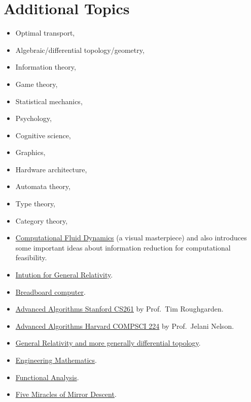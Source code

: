 \hypertarget{additional-topics}{%
\section{Additional Topics}\label{additional-topics}}

\begin{itemize}
\tightlist
\item
  Optimal transport,
\item
  Algebraic/differential topology/geometry,
\item
  Information theory,
\item
  Game theory,
\item
  Statistical mechanics,
\item
  Psychology,
\item
  Cognitive science,
\item
  Graphics,
\item
  Hardware architecture,
\item
  Automata theory,
\item
  Type theory,
\item
  Category theory,
\item
  \href{https://www.youtube.com/c/braintruffle/videos}{Computational
  Fluid Dynamics} (a visual masterpiece) and also introduces some
  important ideas about information reduction for computational
  feasibility.
\item
  \href{https://www.youtube.com/playlist?list=PLu7cY2CPiRjVY-VaUZ69bXHZr5QslKbzo}{Intution
  for General Relativity}.
\item
  \href{https://www.youtube.com/playlist?list=PLowKtXNTBypGqImE405J2565dvjafglHU}{Breadboard
  computer}.
\item
  \href{https://www.youtube.com/playlist?list=PLEGCF-WLh2RJh2yDxlJJjnKswWdoO8gAc}{Advanced
  Algorithms Stanford CS261} by Prof.~Tim Roughgarden.
\item
  \href{https://www.youtube.com/playlist?list=PL2SOU6wwxB0uP4rJgf5ayhHWgw7akUWSf}{Advanced
  Algorithms Harvard COMPSCI 224} by Prof.~Jelani Nelson.
\item
  \href{https://www.youtube.com/playlist?list=PLFeEvEPtX_0S6vxxiiNPrJbLu9aK1UVC}{General
  Relativity and more generally differential topology}.
\item
  \href{https://www.youtube.com/playlist?list=PLMrJAkhIeNNR2W2sPWsYxfrxcASrUt_9j}{Engineering
  Mathematics}.
\item
  \href{https://www.youtube.com/playlist?list=PLo4jXE-LdDTTIIIRwqK35CbFJieSJEcVR}{Functional
  Analysis}.
\item
  \href{https://www.youtube.com/playlist?list=PLAPSKVSdi0obG1b3w4k41JMLFbyBJS5AQ}{Five
  Miracles of Mirror Descent}.
\end{itemize}
